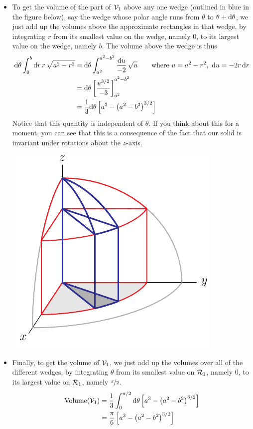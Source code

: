 \begin{eg}
\begin{itemize}
\item 
To get the volume of the part of $\mathcal{V}_1$ above any one wedge (outlined
in blue in the figure below),  say the wedge whose polar angle runs 
from $\theta$ to $\theta+\mathrm{d}\theta$, 
we just add up the volumes above the approximate rectangles in that wedge, 
by integrating $r$ from its smallest value on the wedge, namely $0$, 
to its largest value on the wedge, namely $b$. The volume above 
the wedge is thus
\begin{align*}
\mathrm{d}\theta \int_0^b  \mathrm{d}r\,r\, \sqrt{a^2-r^2}
&= \mathrm{d}\theta \int_{a^2}^{a^2-b^2}  \frac{\mathrm{d}u}{-2}\, \sqrt{u}\qquad
   \text{where } u= a^2-r^2,\ \mathrm{d}u =-2r\,\mathrm{d}r \\
&=  \mathrm{d}\theta\left[\frac{u^{3/2}}{-3}\right]_{a^2}^{a^2-b^2} \\
&=  \frac{1}{3}\mathrm{d}\theta\left[a^3-{\big(a^2-b^2\big)}^{3/2}\right]
\end{align*}
Notice that this quantity is independent of $\theta$. If you think about this
for a moment, you can see that this is a consequence of the fact that
our solid is invariant under rotations about the $z$-axis. 

\begin{efig}
\begin{center}
    \includegraphics{appleCore4.pdf}
\end{center}
\end{efig}

\item 
Finally, to get the volume of $\mathcal{V}_1$, we just add up the volumes 
over all of the different wedges, by integrating $\theta$ from its 
smallest value on $\mathcal{R}_1$, namely $0$, to its largest value on $\mathcal{R}_1$, 
namely $\nicefrac{\pi}{2}$.
\begin{align*}
\text{Volume}(\mathcal{V}_1)
&=\frac{1}{3}\int_0^{\pi/2}\mathrm{d}\theta
   \left[a^3-{\big(a^2-b^2\big)}^{3/2}\right] \\
&=\frac{\pi}{6}\left[a^3-{\big(a^2-b^2\big)}^{3/2}\right]
\end{align*}


\end{itemize}
\end{eg}
